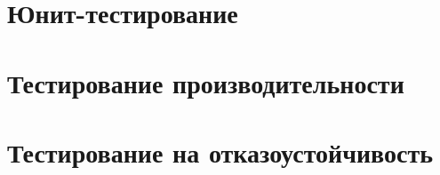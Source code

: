 \section{Юнит-тестирование}
\section{Тестирование производительности}
\section{Тестирование на отказоустойчивость}